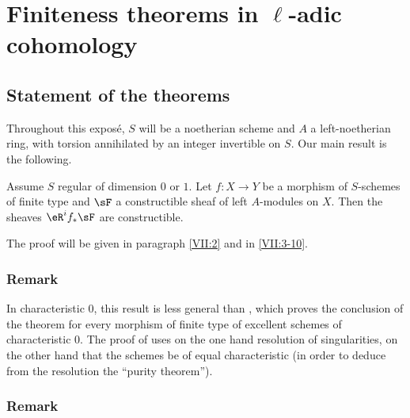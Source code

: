 

\chapter{Finiteness theorems in \texorpdfstring{$\ell$}{l}-adic cohomology}\label{VII}











\section{Statement of the theorems}\label{VII:1}

Throughout this expos\'e, $S$ will be a noetherian scheme and $A$ a
left-noetherian ring, with torsion annihilated by an integer invertible on $S$.
Our main result is the following.




\begin{theorem_}\label{VII:1-1}
Assume $S$ regular of dimension $0$ or $1$. Let $f:X\to Y$ be a
morphism of $S$-schemes of finite type and $\sF$ a constructible sheaf of
left $A$-modules on $X$. Then the sheaves $\eR^i f_\ast \sF$ are
constructible.
\end{theorem_}

The proof will be given in paragraph \ref{VII:2} and in \ref{VII:3-10}.




\subsection{Remark}\label{VII:1-2}

In characteristic $0$, this result is less general than
\cite[XIX paragraph 5]{sga4}, which proves the conclusion of the theorem for
every morphism of finite type of excellent schemes of characteristic $0$.
The proof of \cite[XIX]{sga4} uses on the one hand resolution of
singularities, on the other hand that the schemes be of equal
characteristic (in order to deduce from the resolution the ``purity
theorem'').




\subsection{Remark}\label{VII:1-3}

